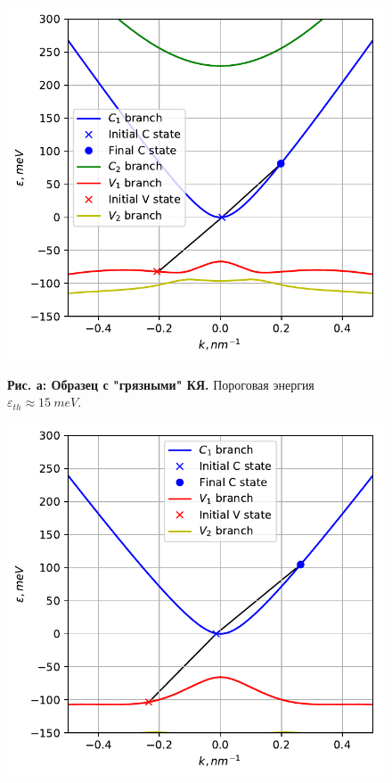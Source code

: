 \documentclass[../main.tex]{subfiles}
\begin{document}
    \begin{figure}[h]
        \begin{minipage}[h]{0.45\linewidth}
            \begin{center}
                \includegraphics[width=1.\linewidth]{./images/18u_impure_40K.pdf}

                \textbf{Рис. а: Образец с "грязными" КЯ.} Пороговая энергия 
                    $\varepsilon_{th} \approx 15~meV$.
            \end{center}
        \end{minipage}
        \hfill
        \begin{minipage}[h]{0.45\linewidth}
            \begin{center}
                \includegraphics[width=1.\linewidth]{./images/18u_pure_40K.pdf}


\end{center}
\end{minipage}
\end{figure}
\end{document}
